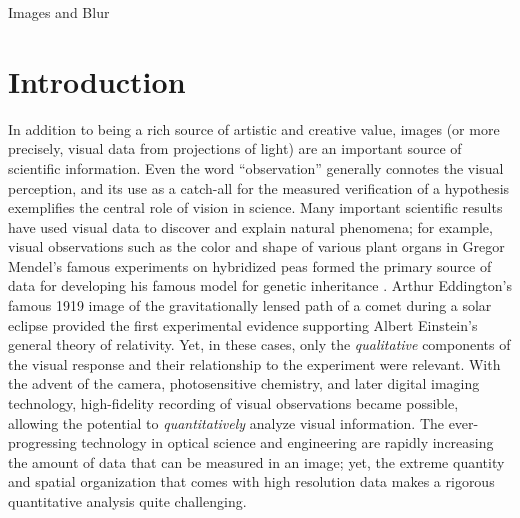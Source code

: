 \setlength{\parindent}{2ex}
\begin{chapter}{Images and Blur}\label{chapter:introduction}
  \section{Introduction}
  In addition to being a rich source of artistic and creative value, images (or more precisely, visual data from projections of light) are an important source of scientific information.
  Even the word ``observation'' generally connotes the visual perception, and its use as a catch-all for the measured verification of a hypothesis exemplifies the central role of vision in science.
  Many important scientific results have used visual data to discover and explain natural phenomena; for example, visual observations such as the color and shape of various plant organs in Gregor Mendel's famous experiments on hybridized peas formed the primary source of data for developing his famous model for genetic inheritance \citep{magner2002}.
  Arthur Eddington's famous 1919 image of the gravitationally lensed path of a comet during a solar eclipse \citep{eddington1920} provided the first experimental evidence supporting Albert Einstein's general theory of relativity.
  Yet, in these cases, only the \emph{qualitative} components of the visual response and their relationship to the experiment were relevant.
  With the advent of the camera, photosensitive chemistry, and later digital imaging technology, high-fidelity recording of visual observations became possible, allowing the potential to \emph{quantitatively} analyze visual information.
  The ever-progressing technology in optical science and engineering are rapidly increasing the amount of data that can be measured in an image; yet, the extreme quantity and spatial organization that comes with high resolution data makes a rigorous quantitative analysis quite challenging.


\end{chapter}
